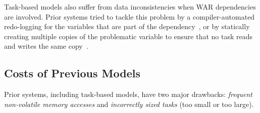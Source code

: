 Task-based models also suffer from data inconsistencies when WAR dependencies are involved. Prior systems tried to tackle this problem by a compiler-automated redo-logging for the variables that are part of the dependency~\cite{alpaca}, or by statically creating multiple copies of the problematic variable to ensure that no task reads and writes the same copy~\cite{chain}.

\subsection{Costs of Previous Models}
\label{sec:cost_task-based}

Prior systems, including task-based models, have two major drawbacks: {\em frequent non-volatile memory accesses} and {\em incorrectly sized tasks} (too small or too large).


